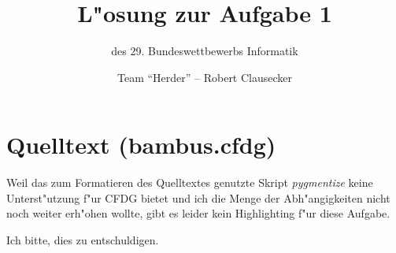 \documentclass{scrreprt}
\author {Team "`Herder"' -- Robert Clausecker}
\title {L"osung zur Aufgabe 1}
\subtitle {des 29. Bundeswettbewerbs Informatik}
\begin{document}
\maketitle

\tableofcontents \newpage

\chapter{Quelltext (bambus.cfdg)}

Weil das zum Formatieren des Quelltextes genutzte Skript \emph{pygmentize} keine
Unterst"utzung f"ur CFDG bietet und ich die Menge der Abh"angigkeiten nicht noch
weiter erh"ohen wollte, gibt es leider kein Highlighting f"ur diese Aufgabe.

Ich bitte, dies zu entschuldigen.

\end{document}
